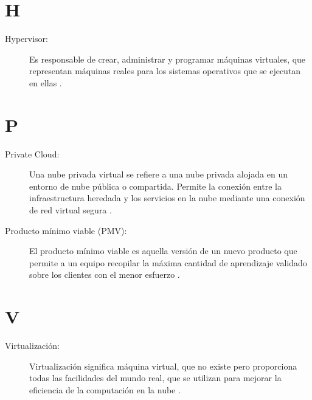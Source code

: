 \section*{H}
\begin{description}
  \item[Hypervisor:] Es responsable de crear, administrar y programar máquinas virtuales, que representan máquinas reales para los sistemas operativos que se ejecutan en ellas \citep{Cinque2024}.
\end{description}

\section*{P}
\begin{description}
  \item[Private Cloud:] Una nube privada virtual se refiere a una nube privada alojada en un entorno de nube pública o compartida. Permite la conexión entre la infraestructura heredada y los servicios en la nube mediante una conexión de red virtual segura \citep{Collins2016}.
  
  \item[Producto mínimo viable (PMV):] El producto mínimo viable es aquella versión de un nuevo producto que permite a un equipo recopilar la máxima cantidad de aprendizaje validado sobre los clientes con el menor esfuerzo \citep{Ries2020}.
\end{description}

\section*{V}
\begin{description}
  \item[Virtualización:] Virtualización significa máquina virtual, que no existe pero proporciona todas las facilidades del mundo real, que se utilizan para mejorar la eficiencia de la computación en la nube \citep{Meena2021}.
\end{description}